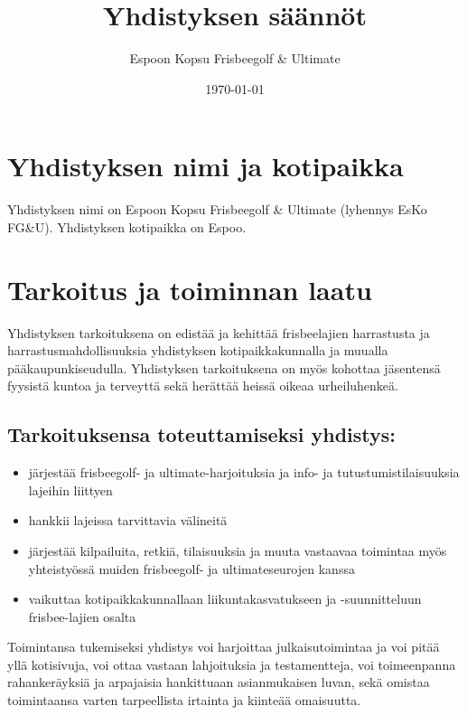 \documentclass[a4paper, 12pt, finnish]{scrartcl}
\title{Yhdistyksen säännöt}
\author{Espoon Kopsu Frisbeegolf \& Ultimate}
\date{\today}
\begin{document}
\maketitle
\newpage

\tableofcontents
\newpage

\section{Yhdistyksen nimi ja kotipaikka}
Yhdistyksen nimi on Espoon Kopsu Frisbeegolf \& Ultimate (lyhennys EsKo FG\&U).
Yhdistyksen kotipaikka on Espoo.

\section{Tarkoitus ja toiminnan laatu}
Yhdistyksen tarkoituksena on edistää ja kehittää frisbeelajien harrastusta ja harrastusmahdollisuuksia yhdistyksen kotipaikkakunnalla ja muualla pääkaupunkiseudulla.
Yhdistyksen tarkoituksena on myös kohottaa jäsentensä fyysistä kuntoa ja terveyttä sekä herättää heissä oikeaa urheiluhenkeä.

\subsection*{Tarkoituksensa toteuttamiseksi yhdistys:}
\begin{itemize}
  \item järjestää frisbeegolf- ja ultimate-harjoituksia ja info- ja tutustumistilaisuuksia lajeihin liittyen
  \item hankkii lajeissa tarvittavia välineitä
  \item järjestää kilpailuita, retkiä, tilaisuuksia ja muuta vastaavaa toimintaa myös yhteistyössä muiden frisbeegolf- ja ultimateseurojen kanssa
  \item vaikuttaa kotipaikkakunnallaan liikuntakasvatukseen ja -suunnitteluun frisbee-lajien osalta
\end{itemize}

Toimintansa tukemiseksi yhdistys voi harjoittaa julkaisutoimintaa ja voi pitää yllä kotisivuja,
voi ottaa vastaan lahjoituksia ja testamentteja,
voi toimeenpanna rahankeräyksiä ja arpajaisia hankittuaan asianmukaisen luvan, sekä omistaa toimintaansa varten tarpeellista irtainta ja kiinteää omaisuutta.
\end{document}
